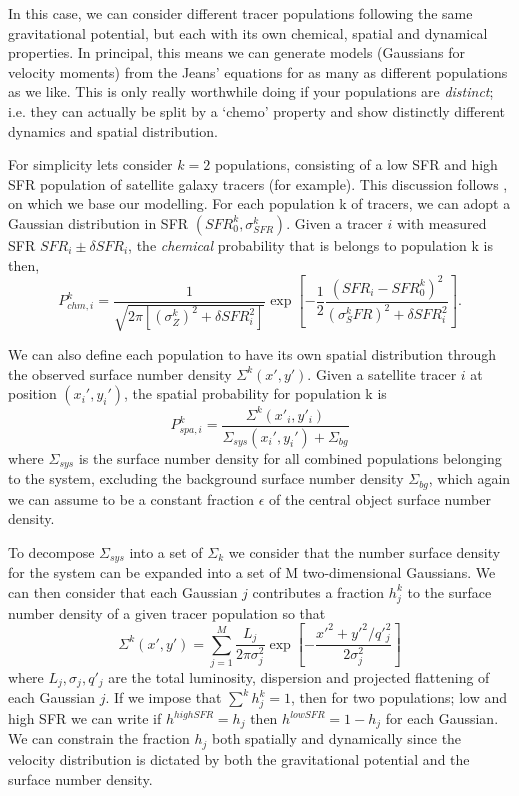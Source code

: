 In this case, we can consider different tracer populations following the same gravitational potential, but each with its own chemical, spatial and dynamical properties. In principal, this means we can generate models (Gaussians for velocity moments) from the Jeans' equations for as many as different populations as we like. This is only really worthwhile doing if your populations are \textit{distinct}; i.e. they can actually be split by a `chemo' property and show distinctly different dynamics and spatial distribution. 

For simplicity lets consider $k=2$ populations, consisting of a low SFR and high SFR population of satellite galaxy tracers (for example). This discussion follows \citet{zhu16sculptor}, on which we base our modelling. For each population k of tracers, we can adopt a Gaussian distribution in SFR $(SFR^{k}_{0},\sigma^{k}_{SFR})$. Given a tracer $i$ with measured SFR $SFR_i \pm \delta SFR_i$, the \textit{chemical} probability that is belongs to population k is then,
\begin{equation}
P_{chm,i}^{k} = \frac{1}{\sqrt{2\pi [(\sigma^{k}_{Z})^2+ \delta SFR_{i}^2]}}\exp{\left[-\frac{1}{2}\frac{(SFR_{i}-SFR^k_0)^2}{(\sigma^k_SFR)^2+\delta SFR_i^2}\right]}. 
\end{equation}

We can also define each population to have its own spatial distribution through the observed surface number density $\Sigma^k(x',y')$. Given a satellite tracer $i$ at position $(x_i',y_i')$, the spatial probability for population k is
\begin{equation}
P^{k}_{spa,i} = \frac{\Sigma^k(x'_i,y'_i)}{\Sigma_{sys}(x_i',y_i')+\Sigma_{bg}}
\end{equation}
where $\Sigma_{sys}$ is the surface number density for all combined populations belonging to the system, excluding the background surface number density $\Sigma_{bg}$, which again we can assume to be a constant fraction $\epsilon$ of the central object surface number density. 

To decompose $\Sigma_{sys}$ into a set of $\Sigma_{k}$ we consider that the number surface density for the system can be expanded into a set of M two-dimensional Gaussians. We can then consider that each Gaussian $j$ contributes a fraction $h^{k}_{j}$ to the surface number density of a given tracer population so that
\begin{equation}
\Sigma^{k}(x',y') = \sum^{M}_{j=1} \frac{L_j}{2\pi \sigma^2_j} \exp{\left[-\frac{x'^2 + y'^2 /q'^2_j}{2\sigma^2_j}\right]}
\end{equation}
where $L_j,\sigma_j,q'_j$ are the total luminosity, dispersion and projected flattening of each Gaussian $j$. If we impose that $\sum^k h^k_j = 1$, then for two populations; low and high SFR we can write if $h^{high SFR} = h_j$ then $h^{low SFR} = 1 - h_j$ for each Gaussian. We can constrain the fraction $h_j$ both spatially and dynamically since the velocity distribution is dictated by both the gravitational potential and the surface number density.

